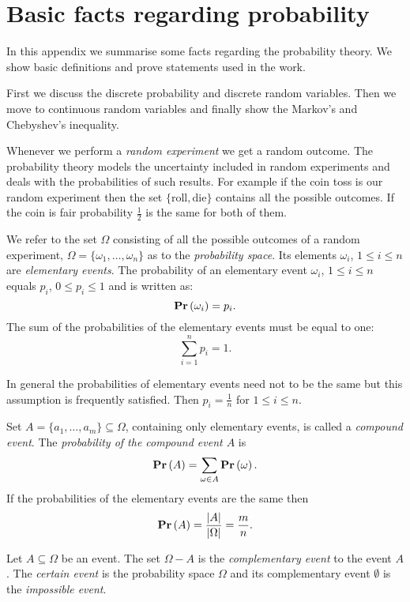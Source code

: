 \chapter{Basic facts regarding probability}
In this appendix we summarise some facts regarding the probability theory. We show basic definitions and prove statements used in the work.

First we discuss the discrete probability and discrete random variables. Then we move to continuous random variables and finally show the Markov's and Chebyshev's inequality.

Whenever we perform a \emph{random experiment} we get a random outcome. The probability theory models the uncertainty included in random experiments and deals with the probabilities of such results. For example if the coin toss is our random experiment then the set $\{\text{roll}, \text{die}\}$ contains all the possible outcomes. If the coin is fair probability $\frac{1}{2}$ is the same for both of them.

\begin{definition}
We refer to the set $\Omega$ consisting of all the possible outcomes of a random experiment, $\Omega = \{ \omega_1, \dots, \omega_n \}$ as to the \emph{probability space}. Its elements $\omega_i$, $1 \leq i \leq n$ are \emph{elementary events}. The probability of an elementary event $\omega_i$, $1 \leq i \leq n$ equals $p_i$, $0 \leq p_i \leq 1$ and is written as: \[ \mathbf{Pr}\left(\omega_i\right) = p_i \text{.} \] The sum of the probabilities of the elementary events must be equal to one:
\[
\displaystyle\sum_{i = 1}^{n} p_i = 1 \text{.}
\]
\end{definition}

In general the probabilities of elementary events need not to be the same but this assumption is frequently satisfied. Then $p_i = \frac{1}{n}$ for $1 \leq i \leq n$.

\begin{definition}
Set $A = \{a_1, \dots, a_m \}\subseteq \Omega$, containing only elementary events, is called a \emph{compound event}. The \emph{probability of the compound event $A$} is \[ \mathbf{Pr}\left(A\right) = \displaystyle\sum_{\omega \in A} \mathbf{Pr}\left(\omega\right) \text{.} \] If the probabilities of the elementary events are the same then 
\[
	\mathbf{Pr}\left(A\right) = \frac{|A|}{|\Omega|} = \frac{m}{n} \text{.}
\]
\end{definition}

\begin{definition}
Let $A \subseteq \Omega$ be an event. The set $\Omega - A$ is the \emph{complementary event} to the event $A$. The \emph{certain event} is the probability space $\Omega$ and its complementary event $\emptyset$ is the \emph{impossible event}.
\end{definition}


